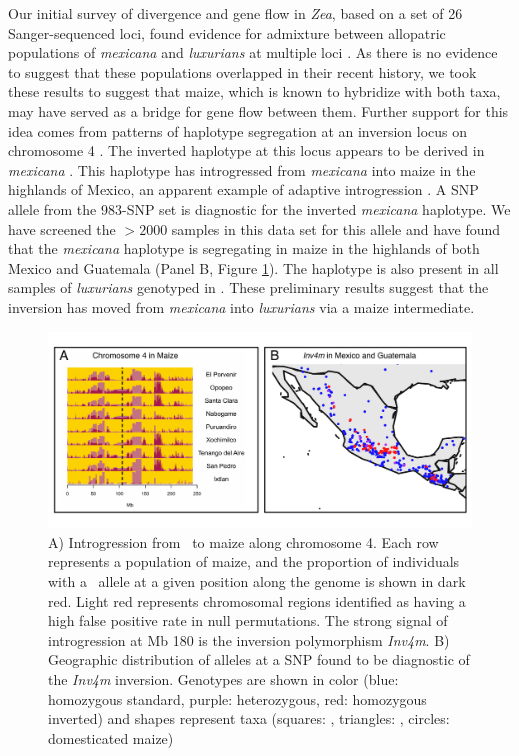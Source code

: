 Our initial survey of divergence and gene flow in \emph{Zea}, based on a set of 26 Sanger-sequenced loci, found evidence for admixture between allopatric populations of \emph{mexicana} and \emph{luxurians} at multiple loci \citep{Ross-Ibarra2009a}. 
As there is no evidence to suggest that these populations overlapped in their recent history, we took these results to suggest that maize, which is known to hybridize with both taxa, may have served as a bridge for gene flow between them.
Further support for this idea comes from patterns of haplotype segregation at an inversion locus on chromosome 4 \citep[\emph{Inv4m};][]{Fang2012,Pyhajarvi2013,Hufford2013}. 
The inverted haplotype at this locus appears to be derived in \emph{mexicana} \citep{Pyhajarvi2013}.
This haplotype has introgressed from \emph{mexicana} into maize in the highlands of Mexico, an apparent example of adaptive introgression \citep[Panel A, Figure \ref{fig:hufmap};][]{Hufford2013}.
A SNP allele from the 983-SNP set is diagnostic for the inverted \emph{mexicana} haplotype.
We have screened the $>2000$ samples in this data set for this allele and have found that the \emph{mexicana} haplotype is segregating in maize in the highlands of both Mexico and Guatemala (Panel B, Figure \ref{fig:hufmap}).  The haplotype is also present in all samples of \emph{luxurians} genotyped in \citet{Fang2012}.
These preliminary results suggest that the inversion has moved from \emph{mexicana} into \emph{luxurians} via a maize intermediate.

\begin{figure}[h!]
  \centering
   \includegraphics[width=1\textwidth]{inv_map.pdf}
    \caption{A) Introgression from \zm\ to maize along chromosome 4.  Each row represents a population of maize, and the proportion of individuals with a \zm\ allele at a given position along the genome is shown in dark red.  Light red represents chromosomal regions identified as having a high false positive rate in null permutations.  The strong signal of introgression at Mb 180 is the inversion polymorphism \emph{Inv4m}. B) Geographic distribution of alleles at a SNP found to be diagnostic of the \emph{Inv4m} inversion.  Genotypes are shown in color (blue: homozygous standard, purple: heterozygous, red: homozygous inverted) and shapes represent taxa (squares: \zm, triangles: \zp, circles: domesticated maize)} 
\label{fig:hufmap}
\end{figure}
